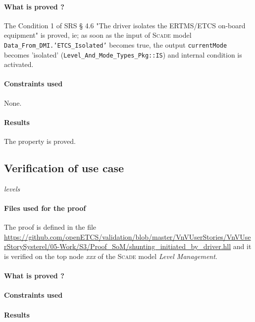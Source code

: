 \documentclass{article}
\newcommand{\SCADE}{\textsc{Scade}}
\begin{document}
\paragraph{What is proved ?}
The Condition 1 of SRS § 4.6 "The driver isolates the ERTMS/ETCS on-board equipment" is proved, ie; as soon as the input of \SCADE{} model \texttt{Data\_From\_DMI.'ETCS\_Isolated'} becomes true, the output \texttt{currentMode} becomes 'isolated' (\texttt{Level\_And\_Mode\_Types\_Pkg::IS}) and internal condition  is activated.


\paragraph{Constraints used}

None.

\paragraph{Results}

The property is proved.

\subsection{Verification of use case}

\emph{levels}


\paragraph{Files used for the proof} The proof is defined in the file \url{https://github.com/openETCS/validation/blob/master/VnVUserStories/VnVUserStorySysterel/05-Work/S3/Proof_SoM/shunting_initiated_by_driver.hll} and it is verified on the top node \emph{xxx} of the \SCADE{} model \emph{Level Management}.

\paragraph{What is proved ?}


\paragraph{Constraints used}


\paragraph{Results}
\end{document}
